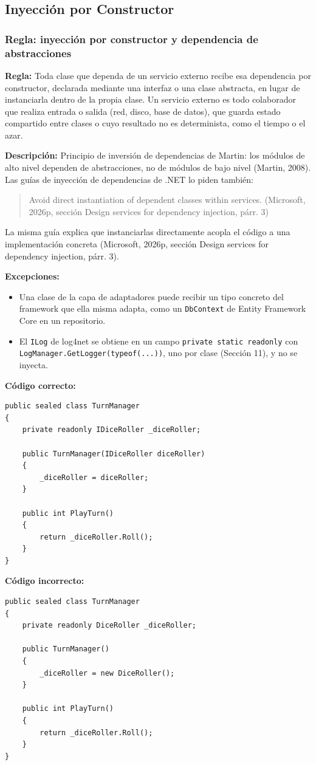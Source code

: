\subsection{Inyección por Constructor}

\subsubsection{Regla: inyección por constructor y dependencia de abstracciones}

\textbf{Regla:} Toda clase que dependa de un servicio externo recibe esa dependencia por constructor, declarada mediante una interfaz o una clase abstracta, en lugar de instanciarla dentro de la propia clase. Un servicio externo es todo colaborador que realiza entrada o salida (red, disco, base de datos), que guarda estado compartido entre clases o cuyo resultado no es determinista, como el tiempo o el azar.

\textbf{Descripción:} Principio de inversión de dependencias de Martin: los módulos de alto nivel dependen de abstracciones, no de módulos de bajo nivel (Martin, 2008). Las guías de inyección de dependencias de .NET lo piden también:
\begin{quote}
Avoid direct instantiation of dependent classes within services. (Microsoft, 2026p, sección Design services for dependency injection, párr. 3)
\end{quote}
\noindent La misma guía explica que instanciarlas directamente acopla el código a una implementación concreta (Microsoft, 2026p, sección Design services for dependency injection, párr. 3).

\textbf{Excepciones:}
\begin{itemize}
    \item Una clase de la capa de adaptadores puede recibir un tipo concreto del framework que ella misma adapta, como un \texttt{DbContext} de Entity Framework Core en un repositorio.
    \item El \texttt{ILog} de log4net se obtiene en un campo \texttt{private static readonly} con \texttt{LogManager.GetLogger(typeof(...))}, uno por clase (Sección 11), y no se inyecta.
\end{itemize}

\textbf{Código correcto:}
\begin{lstlisting}[style=csharpstyle]
public sealed class TurnManager
{
    private readonly IDiceRoller _diceRoller;

    public TurnManager(IDiceRoller diceRoller)
    {
        _diceRoller = diceRoller;
    }

    public int PlayTurn()
    {
        return _diceRoller.Roll();
    }
}
\end{lstlisting}

\textbf{Código incorrecto:}
\begin{lstlisting}[style=csharpstyle]
public sealed class TurnManager
{
    private readonly DiceRoller _diceRoller;

    public TurnManager()
    {
        _diceRoller = new DiceRoller();
    }

    public int PlayTurn()
    {
        return _diceRoller.Roll();
    }
}
\end{lstlisting}
